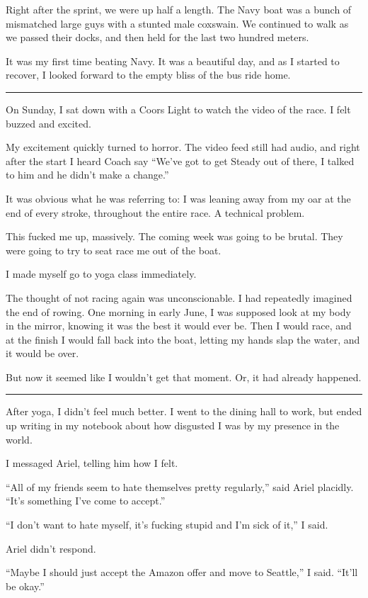 Right after the sprint, we were up half a length.  The Navy boat was a bunch of
mismatched large guys with a stunted male coxswain.  We continued to walk as we
passed their docks, and then held for the last two hundred meters.

It was my first time beating Navy.  It was a beautiful day, and as I started to
recover, I looked forward to the empty bliss of the bus ride home.

\plainfancybreak{12pt}{2}{}

On Sunday, I sat down with a Coors Light to watch the video of the race.  I felt
buzzed and excited.

My excitement quickly turned to horror.  The video feed still had audio, and
right after the start I heard Coach say ``We've got to get Steady out of there,
I talked to him and he didn't make a change.''

It was obvious what he was referring to: I was leaning away from my oar at the
end of every stroke, throughout the entire race.  A technical problem.

This fucked me up, massively.  The coming week was going to be brutal.  They
were going to try to seat race me out of the boat.

I made myself go to yoga class immediately.

The thought of not racing again was unconscionable.  I had repeatedly imagined
the end of rowing.  One morning in early June, I was supposed look at my body in
the mirror, knowing it was the best it would ever be.  Then I would race, and at
the finish I would fall back into the boat, letting my hands slap the water, and
it would be over.

But now it seemed like I wouldn't get that moment.  Or, it had already happened.

\plainfancybreak{12pt}{2}{}

After yoga, I didn't feel much better.  I went to the dining hall to work, but
ended up writing in my notebook about how disgusted I was by my presence in the
world.

I messaged Ariel, telling him how I felt.

``All of my friends seem to hate themselves pretty regularly,'' said Ariel
placidly.  ``It's something I've come to accept.''

``I don't want to hate myself, it's fucking stupid and I'm sick of it,'' I said.

Ariel didn't respond.

``Maybe I should just accept the Amazon offer and move to Seattle,'' I said.
``It'll be okay.''

